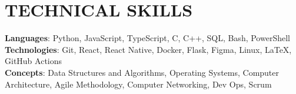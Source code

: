 \section{\textbf {\large TECHNICAL SKILLS}}
    \begin{itemize}[leftmargin=0.15in, label={}]
	\small{\item{
		\textbf{Languages}{: Python, JavaScript, TypeScript, C, C++, SQL, Bash, PowerShell} \\
		\textbf{Technologies}{: Git, React, React Native, Docker, Flask, Figma, Linux, LaTeX, GitHub Actions} \\
		\textbf{Concepts}{: Data Structures and Algorithms, Operating Systems, Computer Architecture, Agile Methodology, Computer Networking, Dev Ops, Scrum}
	}}
    \end{itemize}